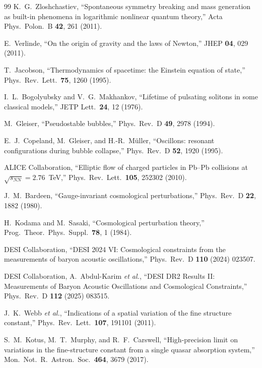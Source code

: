 \documentclass[aps,prd,onecolumn,superscriptaddress,nofootinbib,showpacs,12pt,notitlepage]{revtex4-2}
\begin{document}
\begin{thebibliography}{99}
  K.~G.~Zloshchastiev,
  ``Spontaneous symmetry breaking and mass generation as built-in
  phenomena in logarithmic nonlinear quantum theory,''
  Acta Phys.\ Polon.\ B \textbf{42}, 261 (2011).

  E.~Verlinde,
  ``On the origin of gravity and the laws of Newton,''
  JHEP \textbf{04}, 029 (2011).

  T.~Jacobson,
  ``Thermodynamics of spacetime: the Einstein equation of state,''
  Phys.\ Rev.\ Lett.\ \textbf{75}, 1260 (1995).

  I.~L.~Bogolyubsky and V.~G.~Makhankov,
  ``Lifetime of pulsating solitons in some classical models,''
  JETP Lett.\ \textbf{24}, 12 (1976).

  M.~Gleiser,
  ``Pseudostable bubbles,''
  Phys.\ Rev.\ D \textbf{49}, 2978 (1994).

  E.~J.~Copeland, M.~Gleiser, and H.-R.~M\"uller,
  ``Oscillons: resonant configurations during bubble collapse,''
  Phys.\ Rev.\ D \textbf{52}, 1920 (1995).

  ALICE Collaboration,
  ``Elliptic flow of charged particles in Pb--Pb collisions
  at $\sqrt{s_{NN}} = 2.76$~TeV,''
  Phys.\ Rev.\ Lett.\ \textbf{105}, 252302 (2010).

  J.~M.~Bardeen,
  ``Gauge-invariant cosmological perturbations,''
  Phys.\ Rev.\ D \textbf{22}, 1882 (1980).

  H.~Kodama and M.~Sasaki,
  ``Cosmological perturbation theory,''
  Prog.\ Theor.\ Phys.\ Suppl.\ \textbf{78}, 1 (1984).

  DESI Collaboration,
  ``DESI 2024 VI: Cosmological constraints from the measurements
  of baryon acoustic oscillations,''
  Phys.\ Rev.\ D \textbf{110} (2024) 023507.

  DESI Collaboration, A.~Abdul-Karim \textit{et al.},
  ``DESI DR2 Results II: Measurements of Baryon Acoustic
  Oscillations and Cosmological Constraints,''
  Phys.\ Rev.\ D \textbf{112} (2025) 083515.

  J.~K.~Webb \textit{et al.},
  ``Indications of a spatial variation of the fine structure
  constant,''
  Phys.\ Rev.\ Lett.\ \textbf{107}, 191101 (2011).

  S.~M.~Kotus, M.~T.~Murphy, and R.~F.~Carswell,
  ``High-precision limit on variations in the fine-structure
  constant from a single quasar absorption system,''
  Mon.\ Not.\ R.\ Astron.\ Soc.\ \textbf{464}, 3679 (2017).


\end{thebibliography}
\end{document}
